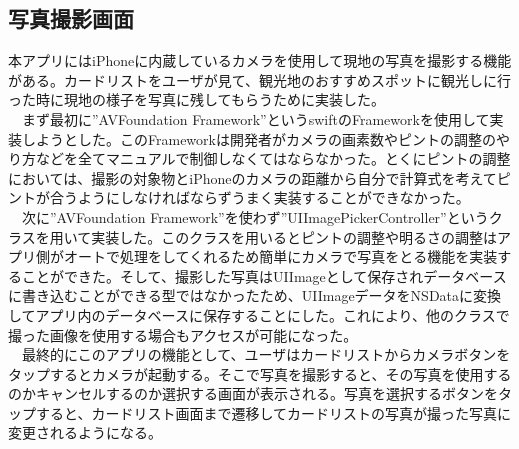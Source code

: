 \subsection{写真撮影画面}
本アプリにはiPhoneに内蔵しているカメラを使用して現地の写真を撮影する機能がある。カードリストをユーザが見て、観光地のおすすめスポットに観光しに行った時に現地の様子を写真に残してもらうために実装した。\\
　まず最初に”AVFoundation Framework”というswiftのFrameworkを使用して実装しようとした。このFrameworkは開発者がカメラの画素数やピントの調整のやり方などを全てマニュアルで制御しなくてはならなかった。とくにピントの調整においては、撮影の対象物とiPhoneのカメラの距離から自分で計算式を考えてピントが合うようにしなければならずうまく実装することができなかった。\\
　次に”AVFoundation Framework”を使わず”UIImagePickerController”というクラスを用いて実装した。このクラスを用いるとピントの調整や明るさの調整はアプリ側がオートで処理をしてくれるため簡単にカメラで写真をとる機能を実装することができた。そして、撮影した写真はUIImageとして保存されデータベースに書き込むことができる型ではなかったため、UIImageデータをNSDataに変換してアプリ内のデータベースに保存することにした。これにより、他のクラスで撮った画像を使用する場合もアクセスが可能になった。\\
　最終的にこのアプリの機能として、ユーザはカードリストからカメラボタンをタップするとカメラが起動する。そこで写真を撮影すると、その写真を使用するのかキャンセルするのか選択する画面が表示される。写真を選択するボタンをタップすると、カードリスト画面まで遷移してカードリストの写真が撮った写真に変更されるようになる。
